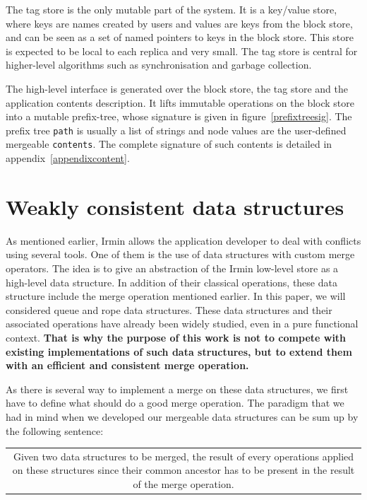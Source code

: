 \documentclass{article}
\newcommand{\irmin}{Irmin\xspace}
\newcommand{\code}[1]{\texttt{#1}}
\begin{document}
The tag store is the only mutable part of the system.
It is a key/value store, where keys are names created by users and values are keys from the block store, and can be seen as a set of named pointers to keys in the block store.
This store is expected to be local to each replica and very small.
The tag store is central for higher-level algorithms such as synchronisation and garbage collection.

The high-level interface is generated over the block store, the tag store and the application contents description.
It lifts immutable operations on the block store into a mutable prefix-tree, whose signature is given in figure~\ref{prefixtreesig}.
The prefix tree \code{path} is usually a list of strings and node values are the user-defined mergeable \code{contents}.
The complete signature of such contents is detailed in appendix~\ref{appendixcontent}.



\section{Weakly consistent data structures}

As mentioned earlier, \irmin allows the application developer to deal with conflicts using several tools.
One of them is the use of data structures with custom merge operators.
The idea is to give an abstraction of the \irmin low-level store as a high-level data structure.
In addition of their classical operations, these data structure include the merge operation mentioned earlier. 
In this paper, we will considered queue and rope data structures.
These data structures and their associated operations have already been widely studied, even in a pure functional context\cite{PurelyFunctionalDataStructures1996}.
\textbf{That is why the purpose of this work is not to compete with existing implementations of such data structures, but to extend them with an efficient and consistent merge operation.}

As there is several way to implement a merge on these data structures, we first have to define what should do a good merge operation.
The paradigm that we had in mind when we developed our mergeable data structures can be sum up by the following sentence:

\smallskip
\begin{tabular}{|c}
\begin{minipage}{0.9\textwidth}
Given two data structures to be merged, the result of every operations applied on these structures since their common ancestor has to be present in the result of the merge operation.
\end{minipage}
\end{tabular}
\smallskip
\end{document}
